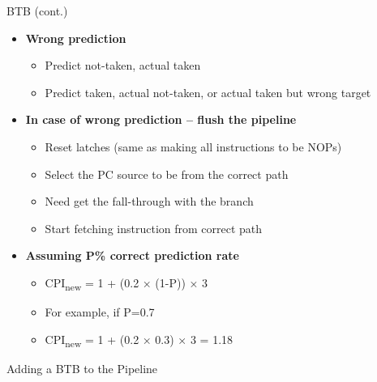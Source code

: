 \documentclass[aspectratio=169,12pt]{beamer}
\begin{document}
\begin{frame}{BTB (cont.)}
    \begin{itemize}
        \item \textbf{Wrong prediction}
        \begin{itemize}
            \item Predict not-taken, actual taken
            \item Predict taken, actual not-taken, or actual taken but wrong target
        \end{itemize}
        \item \textbf{In case of wrong prediction – flush the pipeline}
        \begin{itemize}
            \item Reset latches (same as making all instructions to be NOPs)
            \item Select the PC source to be from the correct path
            \item Need get the fall-through with the branch
            \item Start fetching instruction from correct path
        \end{itemize}
        \item \textbf{Assuming P\% correct prediction rate}
        \begin{itemize}
            \item CPI\textsubscript{new} = 1 + (0.2 × (1-P)) × 3
            \item For example, if P=0.7
            \item CPI\textsubscript{new} = 1 + (0.2 × 0.3) × 3 = 1.18
        \end{itemize}
    \end{itemize}
\end{frame}

\begin{frame}{Adding a BTB to the Pipeline}
    \centering
\end{frame}
\end{document}
